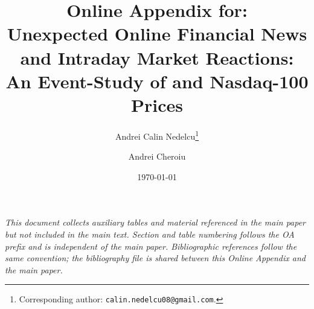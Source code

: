 \documentclass[12pt, a4paper]{article}
\title{Online Appendix for: \\
       Unexpected Online Financial News and Intraday Market Reactions: \\
       An Event-Study of \eurusd{} and Nasdaq-100 Prices}
\author{
  Andrei Calin Nedelcu\thanks{Corresponding author: \texttt{calin.nedelcu08@gmail.com}.}
  \and
  Andrei Cheroiu
}
\date{\today}
\begin{document}
\maketitle

\noindent\textit{This document collects auxiliary tables and material
referenced in the main paper but not included in the main text.
Section and table numbering follows the OA prefix and is independent
of the main paper. Bibliographic references follow the same
convention; the bibliography file is shared between this Online
Appendix and the main paper.}

\bigskip



\clearpage


\end{document}
